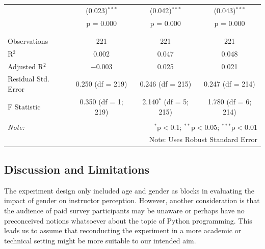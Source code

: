 \documentclass[
]{article}
\begin{document}
\begin{table}[!htbp]
\begin{tabular}{@{\extracolsep{3pt}}lccc}
  & (0.023)$^{***}$ & (0.042)$^{***}$ & (0.043)$^{***}$ \\ 
  & p = 0.000 & p = 0.000 & p = 0.000 \\ 
  & & & \\ 
\hline \\[-1.8ex] 
Observations & 221 & 221 & 221 \\ 
R$^{2}$ & 0.002 & 0.047 & 0.048 \\ 
Adjusted R$^{2}$ & $-$0.003 & 0.025 & 0.021 \\ 
Residual Std. Error & 0.250 (df = 219) & 0.246 (df = 215) & 0.247 (df = 214) \\ 
F Statistic & 0.350 (df = 1; 219) & 2.140$^{*}$ (df = 5; 215) & 1.780 (df = 6; 214) \\ 
\hline 
\hline \\[-1.8ex] 
\textit{Note:}  & \multicolumn{3}{r}{$^{*}$p$<$0.1; $^{**}$p$<$0.05; $^{***}$p$<$0.01} \\ 
 & \multicolumn{3}{r}{Note: Uses Robust Standard Error} \\ 
\end{tabular} 
\end{table}

\clearpage

\hypertarget{discussion-and-limitations}{%
\subsection{Discussion and
Limitations}\label{discussion-and-limitations}}

The experiment design only included age and gender as blocks in
evaluating the impact of gender on instructor perception. However,
another consideration is that the audience of paid survey participants
may be unaware or perhaps have no preconceived notions whatsoever about
the topic of Python programming. This leads us to assume that
reconducting the experiment in a more academic or technical setting
might be more suitable to our intended aim.
\end{document}
